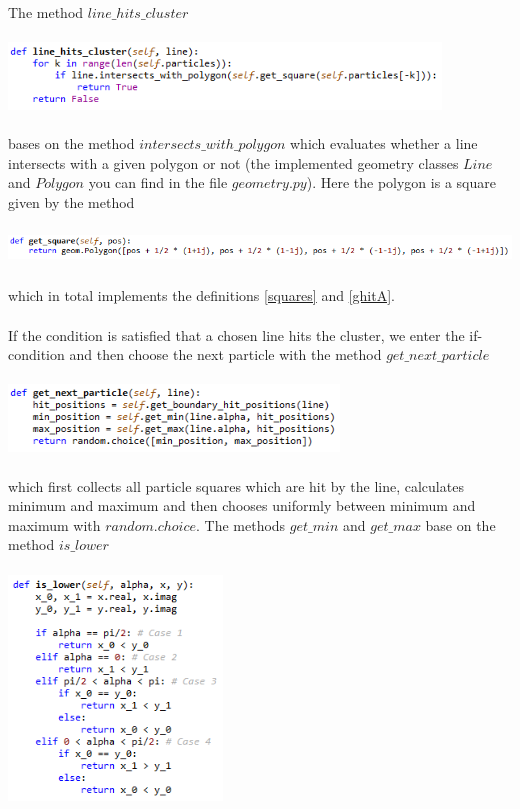 \documentclass[12pt,a4paper]{scrartcl}
\numberwithin{equation}{subsection}
\newcommand{\1}{\mathbbm{1}}
\numberwithin{equation}{section}
\theoremstyle{definition}
\begin{document}
\\The method $\mathit{line\_hits\_cluster}$ \\
\\
\includegraphics[height=1.8cm]{images/code-snippets/linehitscluster.png} \\
\\
bases on the method $\mathit{intersects\_with\_polygon}$ which evaluates whether a line intersects with a given polygon or not (the implemented geometry classes $\mathit{Line}$ and $\mathit{Polygon}$ you can find in the file $\mathit{geometry.py}$). Here the polygon is a square given by the method \\
\\
\includegraphics[height=0.8cm]{images/code-snippets/getsquare.png} \\
\\
which in total implements the definitions \ref{squares} and \ref{ghitA}. \\
\\If the condition is satisfied that a chosen line hits the cluster, we enter the if-condition and then choose the next particle with the method $\mathit{get\_next\_particle}$\\
\\
\includegraphics[height=1.8cm]{images/code-snippets/nextparticle.png} \\
\\
which first collects all particle squares which are hit by the line, calculates minimum and maximum and then chooses uniformly between minimum and maximum with $\mathit{random.choice}$. The methods $\mathit{get\_min}$ and $\mathit{get\_max}$ base on the method $\mathit{is\_lower}$\\
\\
\includegraphics[height=6cm]{images/code-snippets/islower.png} \\
\end{document}
